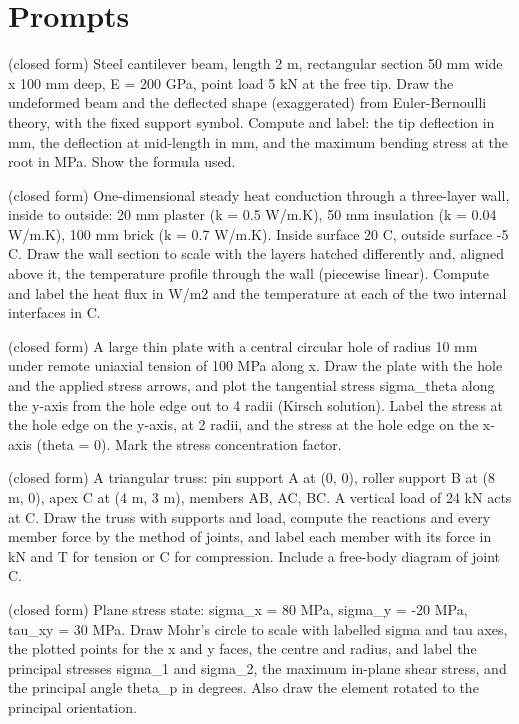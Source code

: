 \documentclass[11pt,a4paper]{article}
\begin{document}
\section{Prompts}
\begin{description}[style=nextline,leftmargin=1em]
\item[\texttt{cantilever\_deflection}] (closed form) Steel cantilever beam, length 2 m, rectangular section 50 mm wide x 100 mm deep, E = 200 GPa, point load 5 kN at the free tip. Draw the undeformed beam and the deflected shape (exaggerated) from Euler-Bernoulli theory, with the fixed support symbol. Compute and label: the tip deflection in mm, the deflection at mid-length in mm, and the maximum bending stress at the root in MPa. Show the formula used.
\item[\texttt{composite\_wall\_conduction}] (closed form) One-dimensional steady heat conduction through a three-layer wall, inside to outside: 20 mm plaster (k = 0.5 W/m.K), 50 mm insulation (k = 0.04 W/m.K), 100 mm brick (k = 0.7 W/m.K). Inside surface 20 C, outside surface -5 C. Draw the wall section to scale with the layers hatched differently and, aligned above it, the temperature profile through the wall (piecewise linear). Compute and label the heat flux in W/m2 and the temperature at each of the two internal interfaces in C.
\item[\texttt{plate\_hole\_kirsch}] (closed form) A large thin plate with a central circular hole of radius 10 mm under remote uniaxial tension of 100 MPa along x. Draw the plate with the hole and the applied stress arrows, and plot the tangential stress sigma\_theta along the y-axis from the hole edge out to 4 radii (Kirsch solution). Label the stress at the hole edge on the y-axis, at 2 radii, and the stress at the hole edge on the x-axis (theta = 0). Mark the stress concentration factor.
\item[\texttt{truss\_member\_forces}] (closed form) A triangular truss: pin support A at (0, 0), roller support B at (8 m, 0), apex C at (4 m, 3 m), members AB, AC, BC. A vertical load of 24 kN acts at C. Draw the truss with supports and load, compute the reactions and every member force by the method of joints, and label each member with its force in kN and T for tension or C for compression. Include a free-body diagram of joint C.
\item[\texttt{mohr\_circle}] (closed form) Plane stress state: sigma\_x = 80 MPa, sigma\_y = -20 MPa, tau\_xy = 30 MPa. Draw Mohr's circle to scale with labelled sigma and tau axes, the plotted points for the x and y faces, the centre and radius, and label the principal stresses sigma\_1 and sigma\_2, the maximum in-plane shear stress, and the principal angle theta\_p in degrees. Also draw the element rotated to the principal orientation.

\end{description}
\end{document}
